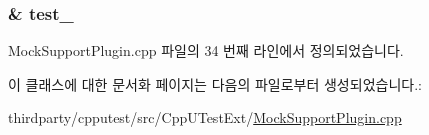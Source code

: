 \subsubsection[{\texorpdfstring{test\+\_\+}{test_}}]{\& test\+\_\+\hspace{0.3cm}{\ttfamily [private]}}\hypertarget{class_mock_support_plugin_reporter_a04705de644c9d275d37d01675cd54a9c}{}\label{class_mock_support_plugin_reporter_a04705de644c9d275d37d01675cd54a9c}


Mock\+Support\+Plugin.\+cpp 파일의 34 번째 라인에서 정의되었습니다.



이 클래스에 대한 문서화 페이지는 다음의 파일로부터 생성되었습니다.\+:\begin{DoxyCompactItemize}
\item 
thirdparty/cpputest/src/\+Cpp\+U\+Test\+Ext/\hyperlink{_mock_support_plugin_8cpp}{Mock\+Support\+Plugin.\+cpp}\end{DoxyCompactItemize}
